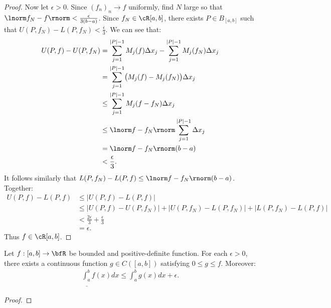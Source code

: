 \documentclass[10pt,twoside,openany]{memoir}
\begin{document}
\begin{proof}
            Now let $\epsilon > 0$. Since $(f_n)_n \rightarrow f$ uniformly, find $N$ large so that $\lnorm f_N - f \rnorm < \frac{\epsilon}{3(b-a)}$. Since $f_N \in \cR[a,b]$, there exists $P \in B_{[a,b]}$ such that $U(P,f_N) - L(P,f_N) < \frac{\epsilon}{3}$. We can see that:
                \begin{equation*}
                \begin{split}
                    U(P,f) - U(P,f_N)
                    & = \sum_{j = 1}^{|P| - 1}M_j(f)\Delta x_j - \sum_{j = 1}^{|P| - 1}M_j(f_N)\Delta x_j \\
                    & = \sum_{j = 1}^{|P| - 1} \bigl(M_j(f) - M_j(f_N)\bigr)\Delta x_j \\
                    & \leq \sum_{j = 1}^{|P| - 1} M_j(f - f_N)\Delta x_j \\
                    & \leq \lnorm f - f_N \rnorm\sum_{j = 1}^{|P| - 1} \Delta x_j \\
                    & = \lnorm f - f_N \rnorm(b-a) \\
                    & < \frac{\epsilon}{3}.
                \end{split}
                \end{equation*}
            It follows similarly that $L(P,f_N) - L(P,f) \leq \lnorm f - f_N \rnorm(b-a)$. Together:
                \begin{equation*}
                \begin{split}
                    U(P,f) - L(P,f)
                    & \leq |U(P,f) - L(P,f)| \\
                    & \leq |U(P,f) - U(P,f_N)| + |U(P,f_N) - L(P,f_N)| + |L(P,f_N) - L(P,f)| \\
                    & < \frac{2\epsilon}{3} + \frac{\epsilon}{3} \\
                    & = \epsilon.
                \end{split}
                \end{equation*}
            Thus $f \in \cR[a,b]$.
        \end{proof}

    \begin{lemma}
        Let $f:[a,b] \rightarrow \bfR$ be bounded and positive-definite function. For each $\epsilon > 0$, there exists a continuous function $g \in C([a,b])$ satisfying $0 \leq g \leq f$. Moreover:
            \begin{equation*}
            \begin{split}
                \underline{\int_a^b}f(x)dx \leq \int_a^bg(x)dx + \epsilon.
            \end{split}
            \end{equation*}
            \begin{proof}
                
            \end{proof}
    \end{lemma}

    
\end{document}
